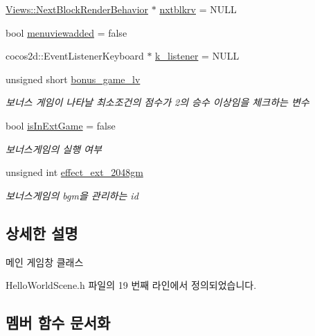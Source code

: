 \begin{DoxyCompactItemize}
\item 
\hyperlink{class_tetris_1_1_views_1_1_next_block_render_behavior}{Views\+::\+Next\+Block\+Render\+Behavior} $\ast$ \hyperlink{class_hello_world_ac06ca16fc5a18d32c58e0229c24817f6}{nxtblkrv} = N\+U\+LL
\item 
bool \hyperlink{class_hello_world_a1e1896c9d67df38903e55eb6782978d8}{menuviewadded} = false
\item 
cocos2d\+::\+Event\+Listener\+Keyboard $\ast$ \hyperlink{class_hello_world_a70a88f59eefadb6a03bd0b3d0ec9cc88}{k\+\_\+listener} = N\+U\+LL
\item 
unsigned short \hyperlink{class_hello_world_a7832a6ec52f92f460f3fc352a06412f4}{bonus\+\_\+game\+\_\+lv}
\begin{DoxyCompactList}\small\item\em 보너스 게임이 나타날 최소조건의 점수가 2의 승수 이상임을 체크하는 변수 \end{DoxyCompactList}\item 
bool \hyperlink{class_hello_world_a6dcd196f83b5eba681717366944fcddf}{is\+In\+Ext\+Game} = false
\begin{DoxyCompactList}\small\item\em 보너스게임의 실행 여부 \end{DoxyCompactList}\item 
unsigned int \hyperlink{class_hello_world_a165832200ec4d9ee283167ac727eeade}{effect\+\_\+ext\+\_\+2048gm}
\begin{DoxyCompactList}\small\item\em 보너스게임의 bgm을 관리하는 id \end{DoxyCompactList}\end{DoxyCompactItemize}


\subsection{상세한 설명}
메인 게임창 클래스 

Hello\+World\+Scene.\+h 파일의 19 번째 라인에서 정의되었습니다.



\subsection{멤버 함수 문서화}
\mbox{\label{class_hello_world_ad3ea29ba5aa294fc4e4f8ee41833b702}} 
